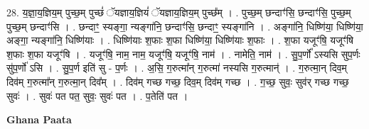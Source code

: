 \documentclass[17pt]{extarticle}
\begin{document}
28. य॒ज्ञा॒य॒ज्ञिय॒म् पुच्छ॒म् पुच्छं॑ ॅयज्ञाय॒ज्ञियं॑ ॅयज्ञाय॒ज्ञिय॒म् पुच्छ᳚म् । . पुच्छ॒म् छन्दाꣳ॑सि॒ छन्दाꣳ॑सि॒ पुच्छ॒म् पुच्छ॒म् छन्दाꣳ॑सि । . छन्दाꣳ॒॒ स्यङ्गा॒ न्यङ्गा॑नि॒ छन्दाꣳ॑सि॒ छन्दाꣳ॒॒ स्यङ्गा॑नि । . अङ्गा॑नि॒ धिष्णि॑या॒ धिष्णि॑या॒ अङ्गा॒ न्यङ्गा॑नि॒ धिष्णि॑याः । . धिष्णि॑याः श॒फाः श॒फा धिष्णि॑या॒ धिष्णि॑याः श॒फाः । . श॒फा यजूꣳ॑षि॒ यजूꣳ॑षि श॒फाः श॒फा यजूꣳ॑षि । . यजूꣳ॑षि॒ नाम॒ नाम॒ यजूꣳ॑षि॒ यजूꣳ॑षि॒ नाम॑ । . नामेति॒ नाम॑ । . सु॒प॒र्णो᳚ ऽस्यसि सुप॒र्णः सु॑प॒र्णो॑ ऽसि । . सु॒प॒र्ण इति॑ सु - प॒र्णः । . अ॒सि॒ ग॒रुत्मा᳚न् ग॒रुत्मा॑ नस्यसि ग॒रुत्मान्॑ । . ग॒रुत्मा॒न् दिव॒म् दिव॑म् ग॒रुत्मा᳚न् ग॒रुत्मा॒न् दिव᳚म् । . दिव॑म् गच्छ गच्छ॒ दिव॒म् दिव॑म् गच्छ । . ग॒च्छ॒ सुवः॒ सुव॑र् गच्छ गच्छ॒ सुवः॑ । . सुवः॑ पत पत॒ सुवः॒ सुवः॑ पत । . प॒तेति॑ पत । \newline

\textbf{Ghana Paata } \newline
\end{document}
